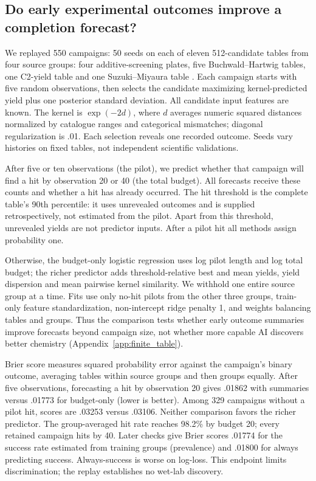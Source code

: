 \subsection{Do early experimental outcomes improve a completion forecast?}
We replayed 550 campaigns: 50 seeds on each of eleven 512-candidate tables from four source groups: four additive-screening plates, five Buchwald--Hartwig tables, one C2-yield table and one Suzuki--Miyaura table \citep{rankovic2026}. Each campaign starts with five random observations, then selects the candidate maximizing kernel-predicted yield plus one posterior standard deviation. All candidate input features are known. The kernel is $\exp(-2d)$, where $d$ averages numeric squared distances normalized by catalogue ranges and categorical mismatches; diagonal regularization is .01. Each selection reveals one recorded outcome. Seeds vary histories on fixed tables, not independent scientific validations.

After five or ten observations (the pilot), we predict whether that campaign will find a hit by observation 20 or 40 (the total budget). All forecasts receive these counts and whether a hit has already occurred. The hit threshold is the complete table's 90th percentile: it uses unrevealed outcomes and is supplied retrospectively, not estimated from the pilot. Apart from this threshold, unrevealed yields are not predictor inputs. After a pilot hit all methods assign probability one.

Otherwise, the budget-only logistic regression uses log pilot length and log total budget; the richer predictor adds threshold-relative best and mean yields, yield dispersion and mean pairwise kernel similarity. We withhold one entire source group at a time. Fits use only no-hit pilots from the other three groups, train-only feature standardization, non-intercept ridge penalty 1, and weights balancing tables and groups. Thus the comparison tests whether early outcome summaries improve forecasts beyond campaign size, not whether more capable AI discovers better chemistry (Appendix~\ref{app:finite_table}).

Brier score measures squared probability error against the campaign's binary outcome, averaging tables within source groups and then groups equally. After five observations, forecasting a hit by observation 20 gives .01862 with summaries versus .01773 for budget-only (lower is better). Among 329 campaigns without a pilot hit, scores are .03253 versus .03106. Neither comparison favors the richer predictor. The group-averaged hit rate reaches 98.2\% by budget 20; every retained campaign hits by 40. Later checks give Brier scores .01774 for the success rate estimated from training groups (prevalence) and .01800 for always predicting success. Always-success is worse on log-loss. This endpoint limits discrimination; the replay establishes no wet-lab discovery.


